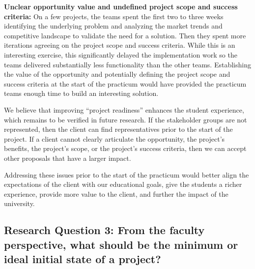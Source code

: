 \textbf{Unclear opportunity value and undefined project scope and success
criteria:} On a few projects, the teams spent the first two to three
weeks identifying the underlying problem and
analyzing the market trends and competitive landscape to validate the
need for a solution. Then they spent more iterations agreeing on the
project scope and success criteria. While this is an interesting
exercise, this significantly delayed the implementation work so the teams delivered substantially less functionality than the other
teams. Establishing the value of the opportunity and potentially
defining the project scope and success criteria at the start of the
practicum would have provided the practicum teams enough time to
build an interesting solution.

We believe that improving ``project readiness'' enhances the student experience, which remains to be verified in future research. If the stakeholder groups are not represented, then the
client can find representatives prior to the start of the project. If a client cannot clearly articulate the opportunity, the project's
benefits, the project's scope, or the project's success criteria, then
we can accept other proposals that have a larger impact.

Addressing these issues prior to the start of the practicum would
better align the expectations of the client with our educational goals, give the students a richer experience, provide more value to the client, and further the impact of the university.

\subsection{Research Question 3: From the faculty perspective, what should be the minimum or ideal initial state of a project?}

